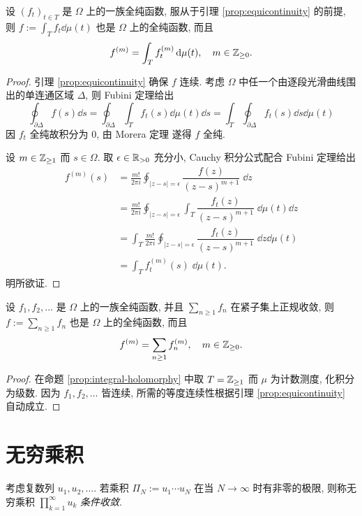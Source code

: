 \begin{proposition}\label{prop:integral-holomorphy}
	设 $(f_t)_{t \in T}$ 是 $\Omega$ 上的一族全纯函数, 服从于引理 \ref{prop:equicontinuity} 的前提, 则 $f := \int_T f_t \dd\mu(t)$ 也是 $\Omega$ 上的全纯函数, 而且
	\[ f^{(m)} = \int_T f^{(m)}_t \mathop{}\!\mathrm{d}\mu(t), \quad m \in \mathbb{Z}_{\geq 0}. \]
\end{proposition}
\begin{proof}
	引理 \ref{prop:equicontinuity} 确保 $f$ 连续. 考虑 $\Omega$ 中任一个由逐段光滑曲线围出的单连通区域 $\Delta$, 则 Fubini 定理给出
	\[ \oint_{\partial \Delta} f(s) \dd s = \oint_{\partial \Delta} \int_T f_t(s) \dd\mu(t) \dd s = \int_T \oint_{\partial \Delta} f_t(s) \dd s \dd\mu(t) \]
	因 $f_t$ 全纯故积分为 $0$, 由 Morera 定理 \cite[\S 3.3, 定理 3]{TW06} 遂得 $f$ 全纯.
	
	设 $m \in \mathbb{Z}_{\geq 1}$ 而 $s \in \Omega$. 取 $\epsilon \in \mathbb{R}_{>0}$ 充分小, Cauchy 积分公式配合 Fubini 定理给出
	\begin{align*}
		f^{(m)}(s) & = \frac{m!}{2\pi i} \oint_{|z -s| = \epsilon} \dfrac{f(z)}{(z-s)^{m+1}}\; \dd z \\
		& = \frac{m!}{2\pi i} \oint_{|z -s| = \epsilon} \int_T \dfrac{f_t(z)}{(z-s)^{m+1}}\; \dd\mu(t) \dd z \\
		& = \int_T \frac{m!}{2\pi i} \oint_{|z -s| = \epsilon} \dfrac{f_t(z)}{(z-s)^{m+1}}\; \dd z \dd\mu(t) \\
		& = \int_T f^{(m)}_t(s) \;\dd\mu(t).
	\end{align*}
	明所欲证.
\end{proof}

\begin{proposition}\label{prop:sum-holomorphy}
	设 $f_1, f_2, \ldots$ 是 $\Omega$ 上的一族全纯函数, 并且 $\sum_{n \geq 1} f_n$ 在紧子集上正规收敛, 则 $f := \sum_{n \geq 1} f_n$ 也是 $\Omega$ 上的全纯函数, 而且
	\[ f^{(m)} = \sum_{n \geq 1} f^{(m)}_n, \quad m \in \mathbb{Z}_{\geq 0}. \]
\end{proposition}
\begin{proof}
	在命题 \ref{prop:integral-holomorphy} 中取 $T = \mathbb{Z}_{\geq 1}$ 而 $\mu$ 为计数测度, 化积分为级数. 因为 $f_1, f_2, \ldots$ 皆连续, 所需的等度连续性根据引理 \ref{prop:equicontinuity} 自动成立.
\end{proof}

\section{无穷乘积}
\begin{definition}
	考虑复数列 $u_1, u_2, \ldots$. 若乘积 $\Pi_N := u_1 \cdots u_N$ 在当 $N \to \infty$ 时有非零的极限, 则称无穷乘积 $\prod_{k=1}^\infty u_k$ \emph{条件收敛}.
\end{definition}

